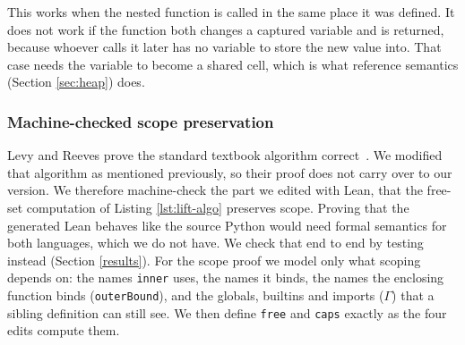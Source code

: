 \documentclass{article}
\newcommand{\code}{\lstinline}
\begin{document}
This works when the nested function is called in the same place it was defined. It does not work if the function both changes a captured variable and is returned, because whoever calls it later has no variable to store the new value into. That case needs the variable to become a shared cell, which is what reference semantics (Section \ref{sec:heap}) does.

\subsubsection{Machine-checked scope preservation}\label{app:lifting-proof}

Levy and Reeves prove the standard textbook algorithm correct~\cite{levy2026simplelambdalifting}. We modified that algorithm as mentioned previously, so their proof does not carry over to our version. We therefore machine-check the part we edited with Lean, that the free-set computation of Listing \ref{lst:lift-algo} preserves scope. Proving that the generated Lean behaves like the source Python would need formal semantics for both languages, which we do not have. We check that end to end by testing instead (Section \ref{results}). For the scope proof we model only what scoping depends on: the names \code{inner} uses, the names it binds, the names the enclosing function binds (\code{outerBound}), and the globals, builtins and imports ($\Gamma$) that a sibling definition can still see. We then define \code{free} and \code{caps} exactly as the four edits compute them.
\end{document}
